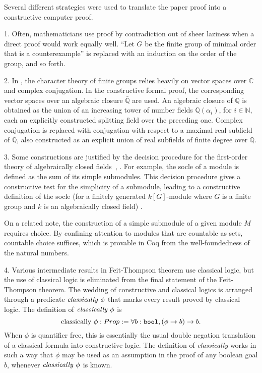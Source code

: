 \documentclass[brochure,english,12pt]{bourbaki}
\theoremstyle{plain}
\def\op#1{{\operatorname{#1}}}
\def\ring#1{{\mathbb{#1}}}
\def\bool{\op{\tt bool}}
\begin{document}
Several different strategies were used to translate the paper proof into a 
constructive computer proof.

1.  Often, mathematicians use proof by contradiction out of sheer laziness when a direct proof
would work equally well.  
``Let $G$ be the finite group of minimal order that is a counterexample'' is
replaced with an induction on the order of the group, and so forth.

2. In \cite{peterfalvi2000character},  the character theory of finite groups relies heavily on 
vector spaces over $\ring{C}$ and complex conjugation.  In the constructive formal proof, the corresponding
vector spaces over an algebraic closure $\bar{\ring{Q}}$ are used.  An algebraic closure of $\ring{Q}$ 
is obtained as the union of an increasing tower of  
number fields $\ring{Q}(\alpha_i)$, for $i\in\ring{N}$, each  an explicitly constructed splitting field
over the preceding one.
Complex conjugation is replaced with
conjugation with respect to a maximal real subfield of $\bar{\ring{Q}}$, also constructed
as an explicit union of real subfields of finite degree over $\ring{Q}$.

3.  Some constructions are justified by the decision procedure for the first-order theory
of algebraically closed fields~\cite{cohen2010formal}, \cite{Ha09}.  
For example, the socle of a module is defined as the sum of its
simple submodules.  This decision procedure gives a constructive test for the simplicity of a submodule,
leading to a constructive definition of the socle  (for a finitely generated 
$k[G]$-module where $G$ is a finite group and $k$ is an algebraically closed field)  \cite{gonthier2011point}.

On a related note, the construction of a simple submodule of a given module $M$ requires choice.
By confining attention to modules that are countable as sets, countable choice suffices, which 
is provable in Coq from the well-foundedness of the natural numbers.


4.  Various intermediate results in Feit-Thompson theorem use classical logic, but the use of classical
logic is eliminated from the final statement of the Feit-Thompson theorem.  The wedding of constructive and
classical logics is  arranged
through a predicate $\op{\it classically}~\phi$ that marks every result proved by classical logic.
The definition of $\op{\it classically}~\phi$ is
\[
\op{classically}~\phi : Prop := \forall {b:\bool}, (\phi\to b) \to b.
\]
When $\phi$ is quantifier free, this is essentially the usual double negation translation of a classical formula into
constructive logic.  The definition of {\it classically} works in such a way that $\phi$ may
be used as an assumption in the proof of any boolean goal $b$, whenever $\op{\it classically}~\phi$ is known.
\end{document}
